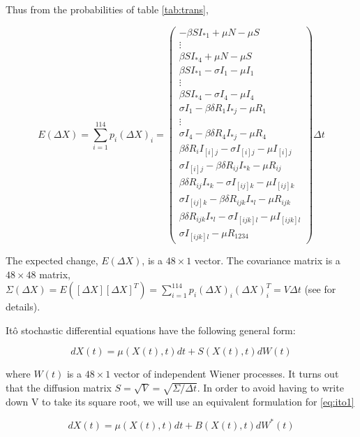 \documentclass[12pt]{article}
\begin{document}
Thus from the probabilities of table \ref{tab:trans},

\begin{equation}
 E(\Delta X)=\sum_{i=1}^{114} p_i (\Delta X)_i=
\begin{pmatrix}
-\beta S I_{*1} + \mu N -\mu S\\
\vdots\\
\beta S I_{*4} + \mu N -\mu S\\
\beta S I_{*1} -\sigma I_1 -\mu I_1\\
\vdots\\
\beta S I_{*4} -\sigma I_4 -\mu I_4\\
\sigma I_1 - \beta \delta R_1 I_{*j} -\mu R_1\\
\vdots\\
\sigma I_4 - \beta \delta R_4 I_{*j} -\mu R_4\\
\beta \delta R_i I_{[i]j} - \sigma I_{[i]j} -\mu I_{[i]j}\\ 
\sigma I_{[i]j} - \beta \delta R_{ij} I_{*k} - \mu R_{ij}\\
\beta \delta R_{ij} I_{*k} -\sigma I_{[ij]k} -\mu I_{[ij]k}\\ 
\sigma I_{[ij]k} - \beta \delta R_{ijk} I_{*l} -\mu R_{ijk}\\
\beta \delta R_{ijk} I_{*l} - \sigma I_{[ijk]l} - \mu I_{[ijk]l} \\
\sigma I_{[ijk]l} - \mu R_{1234}
\end{pmatrix}
 \Delta t
\end{equation}

The expected change, $E(\Delta X)$, is a $48\times 1$ vector. The covariance 
matrix is a $48\times 48$ matrix, $\Sigma(\Delta X)= E([\Delta X][\Delta X]^T) 
=\sum_{i=1}^{114} p_i (\Delta X)_i (\Delta X)_i^T = V \Delta t$ (see 
\citet{allen_modeling_2007} for details).

Itô stochastic differential equations have the following general form:

\begin{equation}
\label{eq:ito1}
 d X(t) = \mu(X(t),t) dt + S(X(t),t) dW(t)
\end{equation}

where $W(t)$ is a $48\times1$ vector of independent Wiener processes. It turns 
out that the 
diffusion matrix $S=\sqrt{V} = \sqrt{\Sigma/\Delta t}$. In order to avoid 
having to write down V to take its square root, we will use an equivalent 
formulation for \ref{eq:ito1}

\begin{equation}
\label{eq:ito2}
 d X(t) = \mu(X(t),t) dt + B(X(t),t) dW^*(t)
\end{equation}
\end{document}
